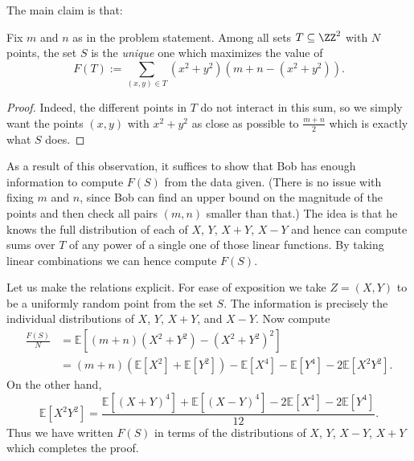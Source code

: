 \documentclass[11pt]{scrartcl}
\begin{document}
The main claim is that:
\begin{claim*}
  Fix $m$ and $n$ as in the problem statement.
  Among all sets $T \subseteq \ZZ^2$ with $N$ points,
  the set $S$ is the \emph{unique} one which maximizes the value of
  \[ F(T):=\sum_{(x,y)\in T} (x^2+y^2)(m+n-(x^2+y^2)).  \]
\end{claim*}
\begin{proof}
  Indeed, the different points in $T$ do not interact in this sum,
  so we simply want the points $(x,y)$ with $x^2+y^2$
  as close as possible to $\frac{m+n}{2}$ which is exactly what $S$ does.
\end{proof}
As a result of this observation,
it suffices to show that Bob has enough information to
compute $F(S)$ from the data given.
(There is no issue with fixing $m$ and $n$,
since Bob can find an upper bound on the magnitude
of the points and then check all pairs $(m,n)$ smaller than that.)
The idea is that he knows the full distribution of each of
$X$, $Y$, $X+Y$, $X-Y$ and hence can compute sums
over $T$ of any power of a single one of those linear functions.
By taking linear combinations we can hence compute $F(S)$.

Let us make the relations explicit.
For ease of exposition we take $Z=(X,Y)$ to be a
uniformly random point from the set $S$.
The information is precisely the individual distributions
of $X$, $Y$, $X+Y$, and $X-Y$.
Now compute
\begin{align*}
  \frac{F(S)}{N} &= \mathbb E\left[ (m+n)(X^2+Y^2) - (X^2+Y^2)^2 \right] \\
  &= (m+n) \left( \mathbb E[X^2] + \mathbb E[Y^2] \right)
  - \mathbb E[X^4] - \mathbb E[Y^4] - 2 \mathbb E[X^2 Y^2].
\end{align*}
On the other hand,
\[ \mathbb E[X^2Y^2]
  = \frac{\mathbb E[(X+Y)^4] + \mathbb E[(X-Y)^4]
  - 2\mathbb E[X^4] - 2\mathbb E[Y^4]}{12}. \]
Thus we have written $F(S)$ in terms of the distributions
of $X$, $Y$, $X-Y$, $X+Y$ which completes the proof.
\end{document}
